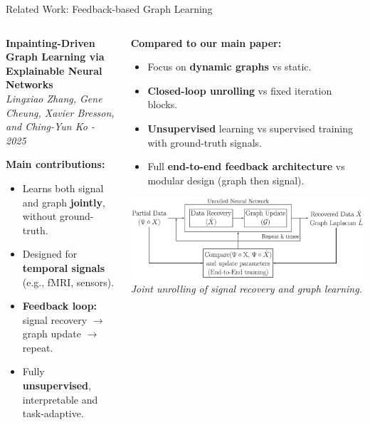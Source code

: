 \documentclass[aspectratio=169,xcolor=dvipsnames]{beamer}
\begin{document}
\begin{frame}{Related Work: Feedback-based Graph Learning}

\begin{columns}[c]

\begin{column}{0.48\textwidth}

\textbf{Inpainting-Driven Graph Learning via Explainable Neural Networks}  
\\\textit{Lingxiao Zhang, Gene Cheung, Xavier Bresson, and Ching-Yun Ko - 2025}

\vspace{0.5cm}
\textbf{Main contributions:}
\begin{itemize}
    \item Learns both signal and graph \textbf{jointly}, without ground-truth.
    \item Designed for \textbf{temporal signals} (e.g., fMRI, sensors).
    \item \textbf{Feedback loop:} signal recovery $\rightarrow$ graph update $\rightarrow$ repeat.
    \item Fully \textbf{unsupervised}, interpretable and task-adaptive.
\end{itemize}

\end{column}

\begin{column}{0.52\textwidth}

\textbf{Compared to our main paper:}
\begin{itemize}
    \item Focus on \textbf{dynamic graphs} vs static.
    \item \textbf{Closed-loop unrolling} vs fixed iteration blocks.
    \item \textbf{Unsupervised} learning vs supervised training with ground-truth signals.
    \item Full \textbf{end-to-end feedback architecture} vs modular design (graph then signal).
\end{itemize}

\vspace{-0.2cm}
\begin{center}
    \includegraphics[width=0.85\linewidth]{paper2.png}
\\\tiny \textit{Joint unrolling of signal recovery and graph learning.}
\end{center}


\end{column}

\end{columns}

\end{frame}
\end{document}
